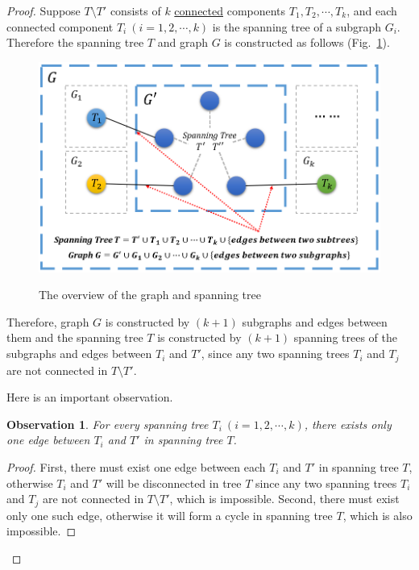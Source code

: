 \documentclass[12pt,a4paper]{article}
\newtheorem*{observation}{Observation}
\theoremstyle{definition}
\begin{document}
\begin{enumerate}
\begin{enumerate}
\begin{proof}
    Suppose $T \setminus T'$ consists of $k$ \underline{connected} components $T_1, T_2, \cdots, T_k$, and each connected component $T_i\ (i = 1,2,\cdots,k)$ is the spanning tree of a subgraph $G_i$. Therefore the spanning tree $T$ and graph $G$ is constructed as follows (Fig.~\ref{fig3-1}).
    \begin{figure}[htbp]
      \centering
      \includegraphics[width=5in]{prob3-1.png}\\
      \caption{The overview of the graph and spanning tree}\label{fig3-1}
    \end{figure}

    Therefore, graph $G$ is constructed by $(k + 1)$ subgraphs and edges between them and the spanning tree $T$ is constructed by $(k+1)$ spanning trees of the subgraphs and edges between $T_i$ and $T'$, since any two spanning trees $T_i$ and $T_j$ are not connected in $T \setminus T'$.

    Here is an important observation.
    \begin{center}
    \begin{minipage}[t]{0.8\linewidth}
    \begin{observation}
    For every spanning tree $T_i\ (i = 1,2,\cdots, k)$, there exists only one edge between $T_i$ and $T'$ in spanning tree $T$.
    \end{observation}
    \begin{proof}
        First, there must exist one edge between each $T_i$ and $T'$ in spanning tree $T$, otherwise $T_i$ and $T'$ will be disconnected in tree $T$ since any two spanning trees $T_i$ and $T_j$ are not connected in $T \setminus T'$, which is impossible. Second, there must exist only one such edge, otherwise it will form a cycle in spanning tree $T$, which is also impossible.
    \end{proof}
    \end{minipage}
    \end{center}


\end{proof}
\end{enumerate}
\end{enumerate}
\end{document}
